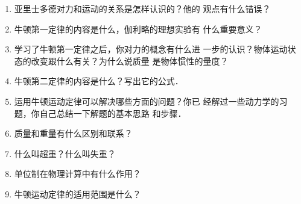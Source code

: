 \begin{enumerate}
    \item 亚里士多德对力和运动的关系是怎样认识的？他的
    观点有什么错误？
    \item 牛顿第一定律的内容是什么，伽利略的理想实验有
    什么重要意义？
    \item 学习了牛顿第一定律之后，你对力的概念有什么进
    一步的认识？物体运动状态的改变跟什么有关？为什么说质量
    是物体惯性的量度？
    \item 牛顿第二定律的内容是什么？写出它的公式．
    \item 运用牛顿运动定律可以解决哪些方面的问题？你已
    经解过一些动力学的习题，你自己总结一下解题的基本思路
    和步骤．
    \item 质量和重量有什么区别和联系？
    \item 什么叫超重？什么叫失重？
    \item 单位制在物理计算中有什么作用？
    \item 牛顿运动定律的适用范围是什么？
\end{enumerate}



